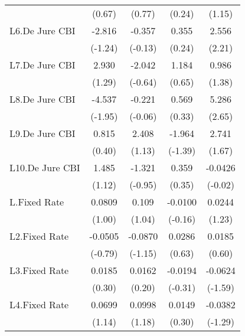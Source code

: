 {\begin{longtable}{l*{4}{c}}
                &   (0.67)         &   (0.77)         &   (0.24)         &   (1.15)         \\
[1em]
L6.De Jure CBI  &   -2.816         &   -0.357         &    0.355         &    2.556\sym{*}  \\
                &  (-1.24)         &  (-0.13)         &   (0.24)         &   (2.21)         \\
[1em]
L7.De Jure CBI  &    2.930         &   -2.042         &    1.184         &    0.986         \\
                &   (1.29)         &  (-0.64)         &   (0.65)         &   (1.38)         \\
[1em]
L8.De Jure CBI  &   -4.537         &   -0.221         &    0.569         &    5.286\sym{**} \\
                &  (-1.95)         &  (-0.06)         &   (0.33)         &   (2.65)         \\
[1em]
L9.De Jure CBI  &    0.815         &    2.408         &   -1.964         &    2.741         \\
                &   (0.40)         &   (1.13)         &  (-1.39)         &   (1.67)         \\
[1em]
L10.De Jure CBI &    1.485         &   -1.321         &    0.359         &  -0.0426         \\
                &   (1.12)         &  (-0.95)         &   (0.35)         &  (-0.02)         \\
[1em]
L.Fixed Rate    &   0.0809         &    0.109         &  -0.0100         &   0.0244         \\
                &   (1.00)         &   (1.04)         &  (-0.16)         &   (1.23)         \\
[1em]
L2.Fixed Rate   &  -0.0505         &  -0.0870         &   0.0286         &   0.0185         \\
                &  (-0.79)         &  (-1.15)         &   (0.63)         &   (0.60)         \\
[1em]
L3.Fixed Rate   &   0.0185         &   0.0162         &  -0.0194         &  -0.0624         \\
                &   (0.30)         &   (0.20)         &  (-0.31)         &  (-1.59)         \\
[1em]
L4.Fixed Rate   &   0.0699         &   0.0998         &   0.0149         &  -0.0382         \\
                &   (1.14)         &   (1.18)         &   (0.30)         &  (-1.29)         \\

\end{longtable}}
